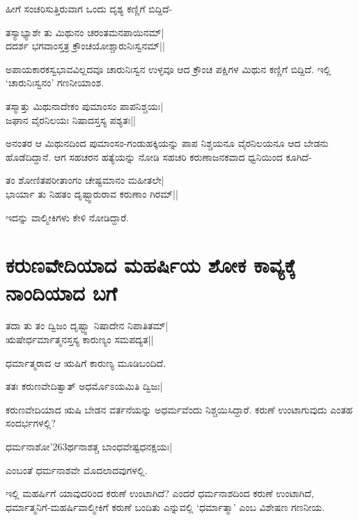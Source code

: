 ಹೀಗೆ ಸಂಚರಿಸುತ್ತಿರುವಾಗ ಒಂದು ದೃಶ್ಯ ಕಣ್ಣಿಗೆ ಬಿದ್ದಿದೆ- 

\begin{shloka} 
ತಸ್ಯಾಭ್ಯಾಶೇ ತು ಮಿಥುನಂ ಚರಂತಮನಪಾಯಿನಮ್‍|\label{198a}\\ 
ದದರ್ಶ ಭಗವಾಂಸ್ತತ್ರ ಕ್ರೌಂಚಯೋಶ್ಚಾರುನಿಃಸ್ವನಮ್‍||
\end{shloka}

ಅಪಾಯಕಾರಕಸ್ವಭಾವವಿಲ್ಲದವೂ ಚಾರುನಿಃಸ್ವನ ಉಳ್ಳವೂ ಆದ ಕ್ರೌಂಚ ಪಕ್ಷಿಗಳ ಮಿಥುನ ಕಣ್ಣಿಗೆ ಬಿದ್ದಿದೆ. ಇಲ್ಲಿ `ಚಾರುನಿಃಸ್ವನಂ' ಗಣನೀಯಾಂಶ. 

\begin{shloka}
ತಸ್ಮಾತ್ತು ಮಿಥುನಾದೇಕಂ ಪುಮಾಂಸಂ ಪಾಪನಿಶ್ಚಯಃ|\label{198}\\ 
ಜಘಾನ ವೈರನಿಲಯಃ ನಿಷಾದಸ್ತಸ್ಯ ಪಶ್ಯತಃ||
\end{shloka}

ಅನಂತರ ಆ ಮಿಥುನದಿಂದ ಪುಮಾಂಸಂ-ಗಂಡುಹಕ್ಕಿಯನ್ನು ಪಾಪ ನಿಶ್ಚಯನೂ ವೈರನಿಲಯನೂ ಆದ ಬೇಡನು ಹೊಡೆದಿದ್ದಾನೆ. ಆಗ ಸಹಚರನ ಹತ್ಯೆಯನ್ನು ನೋಡಿ ಸಹಚರಿ ಕರುಣಾಜನಕವಾದ ಧ್ವನಿಯಿಂದ ಕೂಗಿದೆ- 

\begin{shloka}
ತಂ ಶೋಣಿತಪರೀತಾಂಗಂ ಚೇಷ್ಟಮಾನಂ ಮಹೀತಲೇ|\label{198}\\ 
ಭಾರ್ಯಾ ತು ನಿಹತಂ ದೃಷ್ಟ್ವಾರುರಾವ ಕರುಣಾಂ ಗಿರಮ್‍||
\end{shloka}

ಇದನ್ನು ವಾಲ್ಮೀಕಿಗಳು ಕೇಳಿ ನೋಡಿದ್ದಾರೆ. 

\section*{ಕರುಣವೇದಿಯಾದ ಮಹರ್ಷಿಯ ಶೋಕ ಕಾವ್ಯಕ್ಕೆ ನಾಂದಿಯಾದ ಬಗೆ} 

\begin{shloka} 
ತದಾ ತು ತಂ ದ್ವಿಜಂ ದೃಷ್ಟ್ವಾ ನಿಷಾದೇನ ನಿಪಾತಿತಮ್‍|\label{199}\\ 
ಋಷೇರ್ಧರ್ಮಾತ್ಮನಸ್ತಸ್ಯ ಕಾರುಣ್ಯಂ ಸಮಪದ್ಯತ|| 
\end{shloka}

ಧರ್ಮಾತ್ಮರಾದ ಆ ಋಷಿಗೆ ಕಾರುಣ್ಯ ಮೂಡಿಬಂದಿದೆ. 

\begin{shloka} 
ತತಃ ಕರುಣವೇದಿತ್ವಾತ್‍ ಅಧರ್ಮೊಽಯಮಿತಿ ದ್ವಿಜಃ| 
\end{shloka}

ಕರುಣವೇದಿಯಾದ ಋಷಿ ಬೇಡನ ವರ್ತನೆಯನ್ನು ಅಧರ್ಮವೆಂದು ನಿಶ್ಚಯಿಸಿದ್ದಾರೆ. ಕರುಣೆ ಉಂಟಾಗುವುದು ಎಂತಹ ಸಂದರ್ಭಗಳಲ್ಲಿ? 

\begin{shloka}
ಧರ್ಮನಾಶೋ\char'263ರ್ಥನಾಶತ್ಚ ಬಾಂಧವೇಷ್ಟಧನಕ್ಷಯಃ|\label{199a}
\end{shloka}
ಎಂಬಂತೆ ಧರ್ಮನಾಶವೇ ಮೊದಲಾದವುಗಳಲ್ಲಿ. 

ಇಲ್ಲಿ ಮಹರ್ಷಿಗೆ ಯಾವುದರಿಂದ ಕರುಣೆ ಉಂಟಾಗಿದೆ? ಎಂದರೆ ಧರ್ಮನಾಶದಿಂದ ಕರುಣೆ ಉಂಟಾಗಿದೆ, ಧರ್ಮಾತ್ಮನಿಗೆ-ಮಹರ್ಷಿವಾಲ್ಮೀಕಿಗೆ ಕರುಣೆ ಬಂದಿತು ಎನ್ನುವಲ್ಲಿ `ಧರ್ಮಾತ್ಮಾ' ಎಂಬ ವಿಶೇಷಣ ಗಣನೀಯ. 

